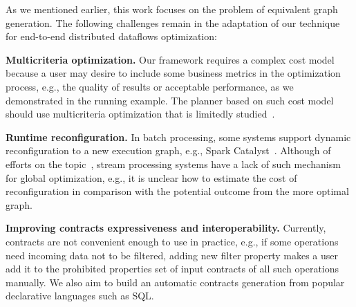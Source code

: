 As we mentioned earlier, this work focuses on the problem of equivalent graph generation. The following challenges remain in the adaptation of our technique for end-to-end distributed dataflows optimization:

\textbf{Multicriteria optimization.}
Our framework requires a complex cost model because a user may desire to include some business metrics in the optimization process, e.g., the quality of results or acceptable performance, as we demonstrated in the running example. The planner based on such cost model should use multicriteria optimization that is limitedly studied~\cite{yarygina2014optimizing}.

\textbf{Runtime reconfiguration.}
In batch processing, some systems support dynamic reconfiguration to a new execution graph, e.g., Spark Catalyst~\cite{armbrust2015spark}. Although of efforts on the topic~\cite{grulich2020grizzly, 10.14778/3329772.3329777}, stream processing systems have a lack of such mechanism for global optimization, e.g., it is unclear how to estimate the cost of reconfiguration in comparison with the potential outcome from the more optimal graph.

\textbf{Improving contracts expressiveness and interoperability.}
Currently, contracts are not convenient enough to use in practice, e.g., if some operations need incoming data not to be filtered, adding new filter property makes a user add it to the prohibited properties set of input contracts of all such operations manually. We also aim to build an automatic contracts generation from popular declarative languages such as SQL.
